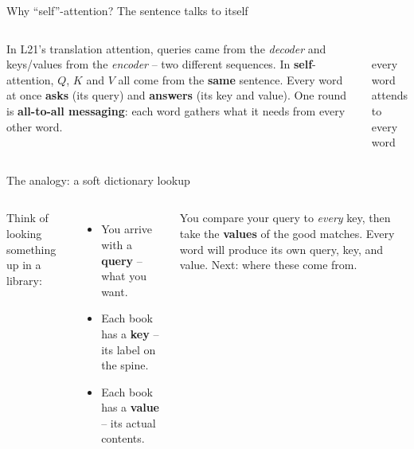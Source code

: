 \documentclass[aspectratio=169]{beamer}
\begin{document}
\begin{frame}{Why ``self''-attention? The sentence talks to itself}
  \begin{columns}[T]
    In L21's translation attention, queries came from the \emph{decoder} and keys/values from the
    \emph{encoder} -- two different sequences.
    \vskip 6pt
    In \textbf{self}-attention, $Q$, $K$ and $V$ all come from the \textbf{same} sentence. Every
    word at once \textbf{asks} (its query) and \textbf{answers} (its key and value). One round is
    \textbf{all-to-all messaging}: each word gathers what it needs from every other word.
    \begin{center}
      \\[4pt]
      {\footnotesize every word attends to every word}
    \end{center}
  \end{columns}
  \vskip 4pt
\end{frame}

\begin{frame}{The analogy: a soft dictionary lookup}
  \begin{columns}[T]
    Think of looking something up in a library:
    \begin{itemize}\small
      \item You arrive with a \textbf{query} -- what you want.
      \item Each book has a \textbf{key} -- its label on the spine.
      \item Each book has a \textbf{value} -- its actual contents.
    \end{itemize}
    \vskip 4pt
    You compare your query to \emph{every} key, then take the \textbf{values} of the good matches.
    \vskip 6pt
    {\small Every word will produce its own query, key, and value. Next: where these come from.}
  \end{columns}
\end{frame}
\end{document}
